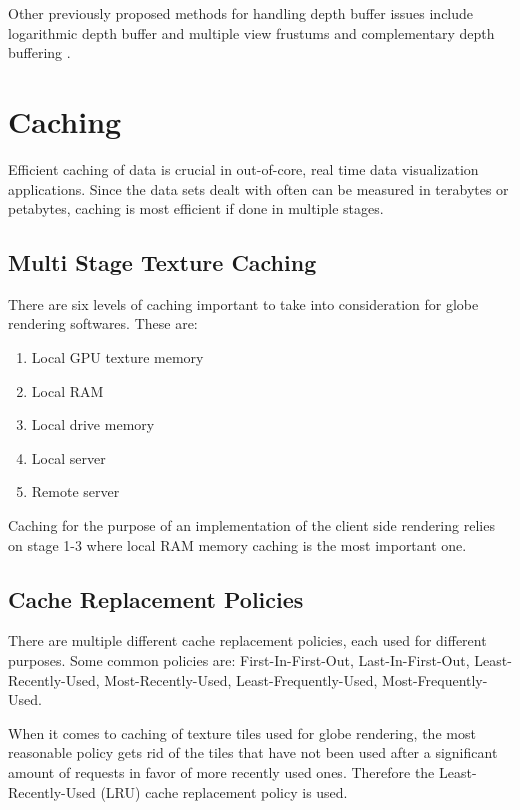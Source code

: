Other previously proposed methods for handling depth buffer issues include logarithmic depth buffer and multiple view frustums and complementary depth buffering \cite{cozzi11}.

\section{Caching}

Efficient caching of data is crucial in out-of-core, real time data visualization applications. Since the data sets dealt with often can be measured in terabytes or petabytes, caching is most efficient if done in multiple stages.

\subsection{Multi Stage Texture Caching}
There are six levels of caching important to take into consideration for globe rendering softwares. These are:

\begin{enumerate}
\item Local GPU texture memory
\item Local RAM
\item Local drive memory
\item Local server
\item Remote server
\end{enumerate}

Caching for the purpose of an implementation of the client side rendering relies on stage 1-3 where local RAM memory caching is the most important one.

\subsection{Cache Replacement Policies}
There are multiple different cache replacement policies, each used for different purposes. Some common policies are: First-In-First-Out, Last-In-First-Out, Least-Recently-Used, Most-Recently-Used, Least-Frequently-Used, Most-Frequently-Used.

When it comes to caching of texture tiles used for globe rendering, the most reasonable policy gets rid of the tiles that have not been used after a significant amount of requests in favor of more recently used ones. Therefore the Least-Recently-Used (LRU) cache replacement policy is used.

